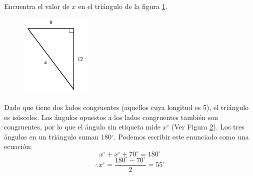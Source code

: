 Encuentra el valor de $x$ en el triángulo de la figura \ref{fig:lados_pitagoras_04}.

\begin{minipage}[t][][t]{0.35\textwidth}
    \begin{figure}[H]
        \centering
        \includegraphics[width=0.3\textwidth]{../images/lados_pitagoras_04.png}

        \caption{}
        \label{fig:lados_pitagoras_04}
    \end{figure}
\end{minipage}\hfill
\begin{minipage}[t][][t]{0.6\textwidth}
    \begin{solutionbox}{8cm}
        \begin{minipage}{0.3\textwidth}
            \begin{figure}[H]
                \centering
                \caption{}
                \label{fig:findangle10a}
            \end{figure}
        \end{minipage}\hfill
        \begin{minipage}{0.65\textwidth}
            Dado que tiene dos lados congruentes (aquellos cuya longitud es 5), el triángulo es isósceles. Los ángulos opuestos a los lados congruentes también son congruentes, por lo que el ángulo sin etiqueta mide $x^\circ$ (Ver Figura \ref{fig:findangle10a}).
            Los tres ángulos en un triángulo suman 180$^\circ$. Podemos escribir este enunciado como una ecuación:
            \[x^\circ + x^\circ + 70^\circ = 180^\circ \]
            \[\therefore x^\circ = \dfrac{180^\circ - 70^\circ}{2}  = 55^\circ\]
        \end{minipage}
    \end{solutionbox}
\end{minipage}
